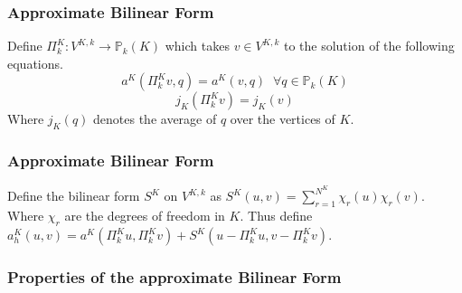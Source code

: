 \documentclass{beamer}
\begin{document}
\begin{frame}
\frametitle{Approximate Bilinear Form}
Define $\Pi_k^K:V^{K,k}\to \mathbb{P}_k(K)$ which takes $v\in V^{K,k}$ to the solution of the following equations.
$$ a^K(\Pi_k^Kv,q)=a^K(v,q)\;\;\forall q \in \mathbb{P}_k(K) $$
$$ j_K(\Pi_k^Kv)=j_K(v) $$
Where $j_K(q)$ denotes the average of $q$ over the vertices of $K$.
\linebreak\linebreak
\end{frame}
\begin{frame}
\frametitle{Approximate Bilinear Form}
Define the bilinear form $S^K$ on $V^{K,k}$ as $ S^K (u,v)=\sum\limits_{r=1}^{N^K} \chi_r (u)\chi_r (v) $.
\linebreak Where $\chi_r$ are the degrees of freedom in $K$.
\linebreak\linebreak
Thus define $a_h^K(u,v)=a^K(\Pi_k^Ku,\Pi_k^Kv)+S^K(u-\Pi_k^Ku,v-\Pi_k^Kv)$.
\end{frame}

\begin{frame}
\frametitle{Properties of the approximate Bilinear Form}
\noindent{}
\end{frame}
\end{document}
